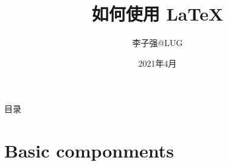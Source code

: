 \documentclass{libs/SUSTech_format}
\title[如何使用 \LaTeX]{\huge \textbf{\fonta 如何使用 \LaTeX}}
\author{李子强@LUG}
\institute[SUSTech]{
    \normalsize{\email{lizq2019@mail.sustech.edu.cn}}
    \newline
    \SUSTech
}
\date{2021年4月}
\begin{document}



{
    \begin{frame}
    \maketitle
    \end{frame}
}

\begin{frame}{目录}
    \begin{multicols}{2}
        \tableofcontents
    \end{multicols}
\end{frame}

\section{Basic componments}
\end{document}
